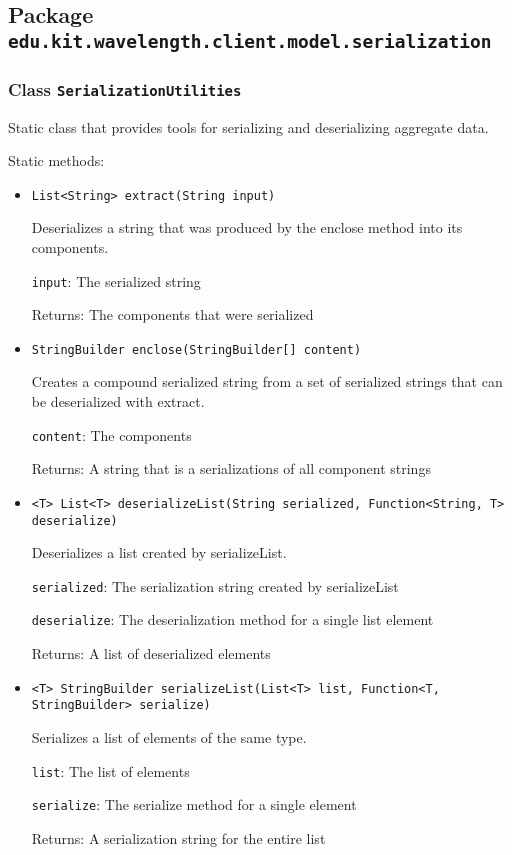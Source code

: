 \subsection{Package \lstinline{edu.kit.wavelength.client.model.serialization}}
\label{pkg:edu.kit.wavelength.client.model.serialization}


\subsubsection{Class \texttt{SerializationUtilities}}
\label{type:edu.kit.wavelength.client.model.serialization.SerializationUtilities}
Static class that provides tools for serializing and deserializing aggregate
 data.

Static methods:
\begin{itemize}
\item \texttt{List<String> extract(String input)}

Deserializes a string that was produced by the enclose method into its
 components.

\texttt{input}: The serialized string

Returns: The components that were serialized

\item \texttt{StringBuilder enclose(StringBuilder[] content)}

Creates a compound serialized string from a set of serialized strings that
 can be deserialized with extract.

\texttt{content}: The components

Returns: A string that is a serializations of all component strings

\item \texttt{<T> List<T> deserializeList(String serialized, Function<String, T> deserialize)}

Deserializes a list created by serializeList.

\texttt{serialized}: The serialization string created by serializeList

\texttt{deserialize}: The deserialization method for a single list element

Returns: A list of deserialized elements

\item \texttt{<T> StringBuilder serializeList(List<T> list, Function<T, StringBuilder> serialize)}

Serializes a list of elements of the same type.

\texttt{list}: The list of elements

\texttt{serialize}: The serialize method for a single element

Returns: A serialization string for the entire list

\end{itemize}

